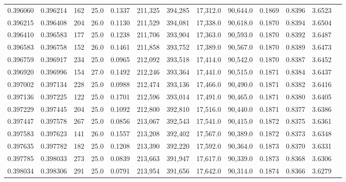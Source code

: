 \begin{tabular}{rrrrrrrrrrrrr}
0.396060 & 0.396214 &   162 & 25.0 &                                     0.1337 & 211,325 & 394,285 &  17,312.0 &  90,644.0 & 0.1869 & 0.8396 & 3.6523 \\
0.396215 & 0.396408 &   204 & 26.0 &                                     0.1130 & 211,529 & 394,081 &  17,338.0 &  90,618.0 & 0.1870 & 0.8394 & 3.6504 \\
0.396410 & 0.396583 &   177 & 25.0 &                                     0.1238 & 211,706 & 393,904 &  17,363.0 &  90,593.0 & 0.1870 & 0.8392 & 3.6487 \\
0.396583 & 0.396758 &   152 & 26.0 &                                     0.1461 & 211,858 & 393,752 &  17,389.0 &  90,567.0 & 0.1870 & 0.8389 & 3.6473 \\
0.396759 & 0.396917 &   234 & 25.0 &                                     0.0965 & 212,092 & 393,518 &  17,414.0 &  90,542.0 & 0.1870 & 0.8387 & 3.6452 \\
0.396920 & 0.396996 &   154 & 27.0 &                                     0.1492 & 212,246 & 393,364 &  17,441.0 &  90,515.0 & 0.1871 & 0.8384 & 3.6437 \\
0.397002 & 0.397134 &   228 & 25.0 &                                     0.0988 & 212,474 & 393,136 &  17,466.0 &  90,490.0 & 0.1871 & 0.8382 & 3.6416 \\
0.397136 & 0.397225 &   122 & 25.0 &                                     0.1701 & 212,596 & 393,014 &  17,491.0 &  90,465.0 & 0.1871 & 0.8380 & 3.6405 \\
0.397229 & 0.397445 &   204 & 25.0 &                                     0.1092 & 212,800 & 392,810 &  17,516.0 &  90,440.0 & 0.1871 & 0.8377 & 3.6386 \\
0.397447 & 0.397578 &   267 & 25.0 &                                     0.0856 & 213,067 & 392,543 &  17,541.0 &  90,415.0 & 0.1872 & 0.8375 & 3.6361 \\
0.397583 & 0.397623 &   141 & 26.0 &                                     0.1557 & 213,208 & 392,402 &  17,567.0 &  90,389.0 & 0.1872 & 0.8373 & 3.6348 \\
0.397635 & 0.397782 &   182 & 25.0 &                                     0.1208 & 213,390 & 392,220 &  17,592.0 &  90,364.0 & 0.1873 & 0.8370 & 3.6331 \\
0.397785 & 0.398033 &   273 & 25.0 &                                     0.0839 & 213,663 & 391,947 &  17,617.0 &  90,339.0 & 0.1873 & 0.8368 & 3.6306 \\
0.398034 & 0.398306 &   291 & 25.0 &                                     0.0791 & 213,954 & 391,656 &  17,642.0 &  90,314.0 & 0.1874 & 0.8366 & 3.6279 \\

\end{tabular}
